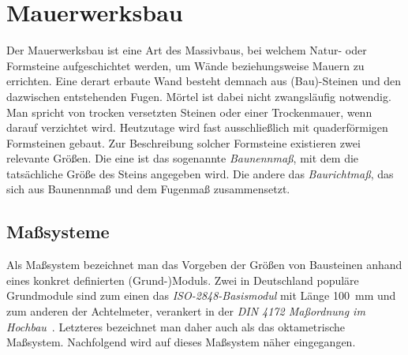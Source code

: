\section{Mauerwerksbau}\label{basics:Mauerwerksbau}
Der Mauerwerksbau ist eine Art des Massivbaus, bei welchem Natur- oder Formsteine aufgeschichtet werden, um Wände beziehungsweise Mauern zu errichten.
Eine derart erbaute Wand besteht demnach aus (Bau)-Steinen und den dazwischen entstehenden Fugen.
Mörtel ist dabei nicht zwangsläufig notwendig.
Man spricht von trocken versetzten Steinen oder einer Trockenmauer, wenn darauf verzichtet wird.
Heutzutage wird fast ausschließlich mit quaderförmigen Formsteinen gebaut.
Zur Beschreibung solcher Formsteine existieren zwei relevante Größen.
Die eine ist das sogenannte \textit{Baunennmaß}, mit dem die tatsächliche Größe des Steins angegeben wird.
Die andere das \textit{Baurichtmaß}, das sich aus Baunennmaß und dem Fugenmaß zusammensetzt.

\subsection{Maßsysteme}
Als Maßsystem bezeichnet man das Vorgeben der Größen von Bausteinen anhand eines konkret definierten (Grund-)Moduls.
Zwei in Deutschland populäre Grundmodule sind zum einen das \textit{ISO-2848-Basismodul} mit Länge 100 mm und zum anderen der Achtelmeter, verankert in der \textit{DIN 4172 Maßordnung im Hochbau}~\cite{ISO2848}\cite{DIN417224}.
Letzteres bezeichnet man daher auch als das oktametrische Maßsystem.
Nachfolgend wird auf dieses Maßsystem näher eingegangen.


